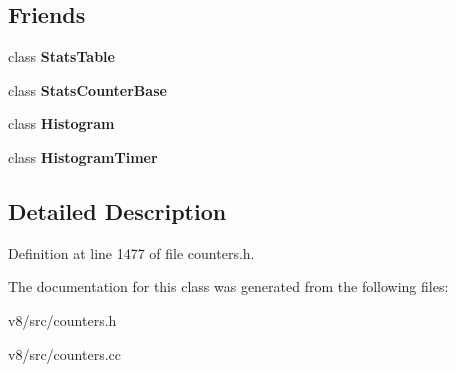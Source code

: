 \subsection*{Friends}
\begin{DoxyCompactItemize}
\item 
\mbox{\label{classv8_1_1internal_1_1Counters_a46e19dba1be874e5aaf0cb832997e1c6}} 
class {\bfseries Stats\+Table}
\item 
\mbox{\label{classv8_1_1internal_1_1Counters_a6931ebe624759cd7ed9c87f3f746626a}} 
class {\bfseries Stats\+Counter\+Base}
\item 
\mbox{\label{classv8_1_1internal_1_1Counters_ad9527905d6ce1859de64c20b8caa2ba1}} 
class {\bfseries Histogram}
\item 
\mbox{\label{classv8_1_1internal_1_1Counters_af1724212a8a1c6a4fcbf8718461fe58a}} 
class {\bfseries Histogram\+Timer}
\end{DoxyCompactItemize}


\subsection{Detailed Description}


Definition at line 1477 of file counters.\+h.



The documentation for this class was generated from the following files\+:\begin{DoxyCompactItemize}
\item 
v8/src/counters.\+h\item 
v8/src/counters.\+cc\end{DoxyCompactItemize}
